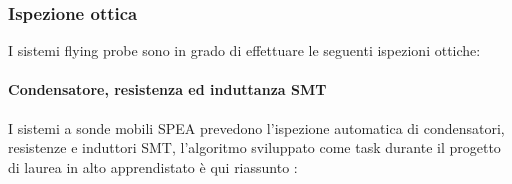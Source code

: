 \subsubsection{Ispezione ottica}
I sistemi flying probe sono in grado di effettuare le seguenti ispezioni ottiche:

\paragraph{Condensatore, resistenza ed induttanza SMT}
\label{aoi:condensatore}

I sistemi a sonde mobili SPEA prevedono l'ispezione automatica di condensatori, resistenze e induttori
SMT, l'algoritmo sviluppato come task durante il progetto di laurea in alto apprendistato è qui riassunto :

\vspace{5mm}


